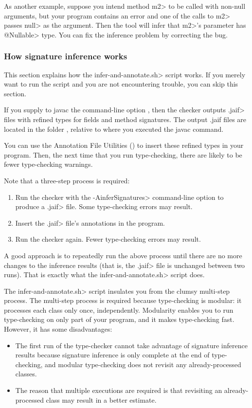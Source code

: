 As another example, suppose you intend method \<m2> to be called with
non-null arguments, but your program contains an error and one of the calls
to \<m2> passes \<null> as the argument.  Then the tool will infer that
\<m2>'s parameter has \<@Nullable> type.
You can fix the inference problem by correcting the bug.


\subsubsection{How signature inference works\label{how-signature-inference-works}}

This section explains how the \<infer-and-annotate.sh> script works.  If you
merely want to run the script and you are not encountering trouble, you can
skip this section.

If you
supply to javac the command-line option , then the
checker outputs \<.jaif> files with refined types for fields and method signatures.
The output .jaif files are located in the folder ,
relative to where you executed the javac command.

You can use the Annotation File Utilities
() to
insert these refined types in your program.  Then, the next time that you
run type-checking, there are likely to be fewer type-checking warnings.

Note that a three-step process is required:
\begin{enumerate}
\item Run the checker with the \<-AinferSignatures> command-line option to
  produce a \<.jaif> file.  Some type-checking errors may result.
\item Insert the \<.jaif> file's annotations in the program.
\item Run the checker again.  Fewer type-checking errors may result.
\end{enumerate}
\noindent
A good approach is to repeatedly run the above process until there are no
more changes to the inference results (that is, the \<.jaif> file is
unchanged between two runs).  That is exactly what the
\<infer-and-annotate.sh> script does.

The \<infer-and-annotate.sh> script insulates you from the
clumsy multi-step process.  The multi-step process
is required because type-checking is modular:
it processes each class only once, independently.  Modularity enables you
to run type-checking on only part of your program, and
it makes type-checking fast.  However, it has some disadvantages:
\begin{itemize}
\item
  The first run of the type-checker cannot take advantage
  of signature inference results because signature inference is only complete at the
  end of type-checking, and modular type-checking does not revisit any
  already-processed classes.
\item
  The reason that multiple executions are required is that revisiting an
  already-processed class may result in a better estimate.
\end{itemize}



